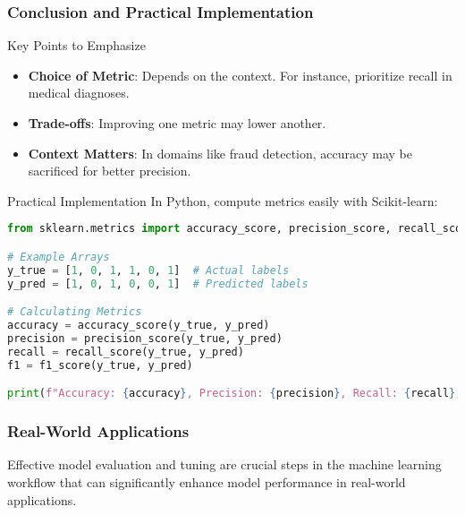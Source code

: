 \documentclass[aspectratio=169]{beamer}
\begin{document}
\begin{frame}[fragile]
    \frametitle{Conclusion and Practical Implementation}
    \begin{block}{Key Points to Emphasize}
        \begin{itemize}
            \item \textbf{Choice of Metric}: Depends on the context. For instance, prioritize recall in medical diagnoses.
            \item \textbf{Trade-offs}: Improving one metric may lower another. 
            \item \textbf{Context Matters}: In domains like fraud detection, accuracy may be sacrificed for better precision.
        \end{itemize}
    \end{block}

    \begin{block}{Practical Implementation}
        In Python, compute metrics easily with Scikit-learn:
        \begin{lstlisting}[language=Python]
from sklearn.metrics import accuracy_score, precision_score, recall_score, f1_score

# Example Arrays
y_true = [1, 0, 1, 1, 0, 1]  # Actual labels
y_pred = [1, 0, 1, 0, 0, 1]  # Predicted labels

# Calculating Metrics
accuracy = accuracy_score(y_true, y_pred)
precision = precision_score(y_true, y_pred)
recall = recall_score(y_true, y_pred)
f1 = f1_score(y_true, y_pred)

print(f"Accuracy: {accuracy}, Precision: {precision}, Recall: {recall}, F1-Score: {f1}")
        \end{lstlisting}
    \end{block}
\end{frame}

\begin{frame}[fragile]
    \frametitle{Real-World Applications}
    Effective model evaluation and tuning are crucial steps in the machine learning workflow that can significantly enhance model performance in real-world applications.
\end{frame}
\end{document}
